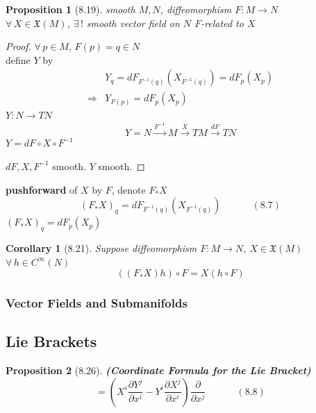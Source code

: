 \documentclass[11pt]{amsart}
\newtheorem{proposition}{Proposition}
\newtheorem{corollary}{Corollary}
\theoremstyle{definition}
\begin{document}
\begin{proposition}[8.19]
  smooth $M,N$, diffeomorphism $F:M \to N$ \\
$\forall \, X \in \mathfrak{X}(M)$, $\exists \, !$ smooth vector field on $N$ $F$-related to $X$
\end{proposition}

\begin{proof}
$\forall \, p \in M$, $F(p) = q\in N$  \\

define $Y$ by
\[
\begin{aligned}
  & Y_q = dF_{F^{-1}(q)}(X_{F^{-1}(q)} ) = dF_p(X_p) \\
  \Longrightarrow & Y_{F(p)} = dF_p(X_p)
\end{aligned}
\]
$Y: N \to TN$
\[
Y = N \xrightarrow{F^{-1}} M \xrightarrow{X} TM \xrightarrow{dF} TN
\]
$Y = dF \circ X \circ F^{-1}$

$dF, X, F^{-1}$ smooth.  $Y$ smooth.
\end{proof}
\textbf{pushforward} of $X$ by $F$, denote $F_*X$
\begin{equation}
  (F_*X)_q = dF_{F^{-1}(q)}(X_{F^{-1}(q) } ) \quad \quad \quad \, (8.7)
\end{equation}
$(F_*X)_q = dF_p(X_p)$



\begin{corollary}[8.21]
  Suppose diffeomorphism $F: M \to N$, $X \in \mathfrak{X}(M)$ \\
  $\forall \, h \in C^{\infty}(N)$
\[
((F_*X)h) \circ F = X(h\circ F)
\]
\end{corollary}


\subsubsection*{Vector Fields and Submanifolds}


\subsection*{Lie Brackets}

\begin{proposition}[8.26] \textbf{(Coordinate Formula for the Lie Bracket)}
  \begin{equation}
    [X,Y] = \left( X^i \frac{ \partial Y^j}{ \partial x^i } - Y^i \frac{ \partial X^j}{ \partial x^i } \right) \frac{\partial}{ \partial x^j }  \quad \quad \quad \, (8.8)
\end{equation}
\end{proposition}
\end{document}
